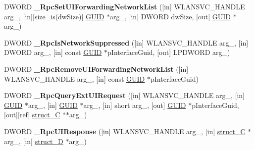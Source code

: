 \begin{DoxyCompactItemize}
\item 
\mbox{\label{interfacewlansvc__interface_a7bde6d4eb07978035985df5429f6973b}} 
D\+W\+O\+RD {\bfseries \+\_\+\+Rpc\+Set\+U\+I\+Forwarding\+Network\+List} (\mbox{[}in\mbox{]} W\+L\+A\+N\+S\+V\+C\+\_\+\+H\+A\+N\+D\+LE arg\+\_, \mbox{[}in\mbox{]}\mbox{[}size\+\_\+is(dw\+Size)\mbox{]} \hyperlink{interface_g_u_i_d}{G\+U\+ID} $\ast$arg\+\_, \mbox{[}in\mbox{]} D\+W\+O\+RD dw\+Size, \mbox{[}out\mbox{]} \hyperlink{interface_g_u_i_d}{G\+U\+ID} $\ast$arg\+\_)
\item 
\mbox{\label{interfacewlansvc__interface_ac2e524b05b34657b5f2957157389d9fd}} 
D\+W\+O\+RD {\bfseries \+\_\+\+Rpc\+Is\+Network\+Suppressed} (\mbox{[}in\mbox{]} W\+L\+A\+N\+S\+V\+C\+\_\+\+H\+A\+N\+D\+LE arg\+\_, \mbox{[}in\mbox{]} D\+W\+O\+RD arg\+\_, \mbox{[}in\mbox{]} const \hyperlink{interface_g_u_i_d}{G\+U\+ID} $\ast$p\+Interface\+Guid, \mbox{[}out\mbox{]} L\+P\+D\+W\+O\+RD arg\+\_)
\item 
\mbox{\label{interfacewlansvc__interface_a808c104768053366222ebf46c3ace98f}} 
D\+W\+O\+RD {\bfseries \+\_\+\+Rpc\+Remove\+U\+I\+Forwarding\+Network\+List} (\mbox{[}in\mbox{]} W\+L\+A\+N\+S\+V\+C\+\_\+\+H\+A\+N\+D\+LE arg\+\_, \mbox{[}in\mbox{]} const \hyperlink{interface_g_u_i_d}{G\+U\+ID} $\ast$p\+Interface\+Guid)
\item 
\mbox{\label{interfacewlansvc__interface_a6e0bb18de6bf93ad53bc344241353e63}} 
D\+W\+O\+RD {\bfseries \+\_\+\+Rpc\+Query\+Ext\+U\+I\+Request} (\mbox{[}in\mbox{]} W\+L\+A\+N\+S\+V\+C\+\_\+\+H\+A\+N\+D\+LE arg\+\_, \mbox{[}in\mbox{]} \hyperlink{interface_g_u_i_d}{G\+U\+ID} $\ast$arg\+\_, \mbox{[}in\mbox{]} \hyperlink{interface_g_u_i_d}{G\+U\+ID} $\ast$arg\+\_, \mbox{[}in\mbox{]} short arg\+\_, \mbox{[}out\mbox{]} \hyperlink{interface_g_u_i_d}{G\+U\+ID} $\ast$p\+Interface\+Guid, \mbox{[}out\mbox{]}\mbox{[}ref\mbox{]} \hyperlink{structstruct___c}{struct\+\_\+C} $\ast$$\ast$arg\+\_)
\item 
\mbox{\label{interfacewlansvc__interface_ab6c5fdc06ad205ba314fe1a6937cd87a}} 
D\+W\+O\+RD {\bfseries \+\_\+\+Rpc\+U\+I\+Response} (\mbox{[}in\mbox{]} W\+L\+A\+N\+S\+V\+C\+\_\+\+H\+A\+N\+D\+LE arg\+\_, \mbox{[}in\mbox{]} \hyperlink{structstruct___c}{struct\+\_\+C} $\ast$arg\+\_, \mbox{[}in\mbox{]} \hyperlink{structstruct___d}{struct\+\_\+D} $\ast$arg\+\_)
$$
\end{DoxyCompactItemize}
